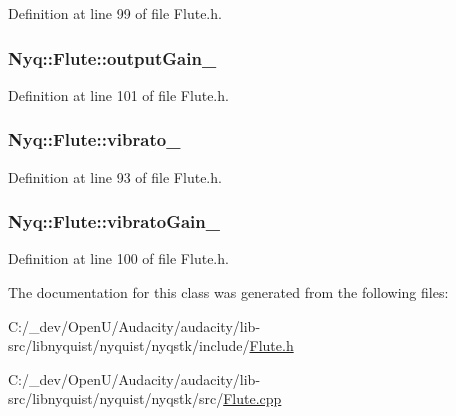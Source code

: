 Definition at line 99 of file Flute.\+h.

\subsubsection[{\texorpdfstring{output\+Gain\+\_\+}{outputGain_}}]{ Nyq\+::\+Flute\+::output\+Gain\+\_\+\hspace{0.3cm}{\ttfamily [protected]}}\hypertarget{class_nyq_1_1_flute_ad5cee79e6b5e0c38ca3c50ae9cfaf8c6}{}\label{class_nyq_1_1_flute_ad5cee79e6b5e0c38ca3c50ae9cfaf8c6}


Definition at line 101 of file Flute.\+h.

\subsubsection[{\texorpdfstring{vibrato\+\_\+}{vibrato_}}]{ Nyq\+::\+Flute\+::vibrato\+\_\+\hspace{0.3cm}{\ttfamily [protected]}}\hypertarget{class_nyq_1_1_flute_a57638f7929851e53a510e3ea7813bd7b}{}\label{class_nyq_1_1_flute_a57638f7929851e53a510e3ea7813bd7b}


Definition at line 93 of file Flute.\+h.

\subsubsection[{\texorpdfstring{vibrato\+Gain\+\_\+}{vibratoGain_}}]{ Nyq\+::\+Flute\+::vibrato\+Gain\+\_\+\hspace{0.3cm}{\ttfamily [protected]}}\hypertarget{class_nyq_1_1_flute_aef0dcde5d9dab7fcf11114d17ae793fd}{}\label{class_nyq_1_1_flute_aef0dcde5d9dab7fcf11114d17ae793fd}


Definition at line 100 of file Flute.\+h.



The documentation for this class was generated from the following files\+:\begin{DoxyCompactItemize}
\item 
C\+:/\+\_\+dev/\+Open\+U/\+Audacity/audacity/lib-\/src/libnyquist/nyquist/nyqstk/include/\hyperlink{_flute_8h}{Flute.\+h}\item 
C\+:/\+\_\+dev/\+Open\+U/\+Audacity/audacity/lib-\/src/libnyquist/nyquist/nyqstk/src/\hyperlink{_flute_8cpp}{Flute.\+cpp}\end{DoxyCompactItemize}
